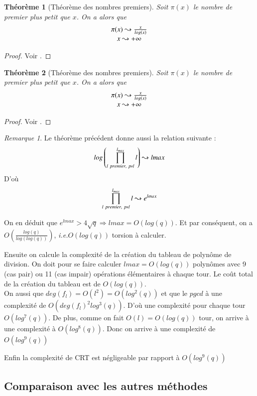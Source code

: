 \documentclass{article}%
\theoremstyle{plain}
\newtheorem{theoreme}{Théorème}[section]
\theoremstyle{definition}
\theoremstyle{plain}
\theoremstyle{plain}
\theoremstyle{remark}
\newtheorem*{remarque}{Remarque}
\newcommand\ie{\textit{i.e.}}
\begin{document}
\begin{theoreme}[Théorème des nombres premiers]
Soit $\pi(x)$ le nombre de premier plus petit que $x$. On a alors que $$
\begin{array}{cl cl}
\pi(x)\leadsto\frac{x}{log(x)}\\
x \leadsto +\infty 
\end{array}$$
\end{theoreme}
\begin{proof}
Voir \cite{ref5}.
\end{proof}
\begin{theoreme}[Théorème des nombres premiers]
Soit $\pi(x)$ le nombre de premier plus petit que $x$. On a alors que $$
\begin{array}{cl cl}
\pi(x)\leadsto\frac{x}{log(x)}\\
x \leadsto +\infty 
\end{array}$$
\end{theoreme}
\begin{proof}
Voir \cite{ref5}.
\end{proof}
\begin{remarque}
Le théorème précédent donne aussi la relation suivante :
$$log\left(\prod_{l\ premier,\ p\nshortmid l}^{l_{max}}l\right) \leadsto lmax$$
D'où $$\prod_{l\ premier,\ p\nshortmid l}^{l_{max}}l\leadsto e^{lmax}$$  
\end{remarque}
On en déduit que $e^{lmax}>4\sqrt{q} \Rightarrow lmax = O(log(q))$. Et par conséquent, on a $O\left(\frac{log(q)}{log(log(q))}\right)$, \ie $O(log(q))$ torsion à calculer.


Ensuite on calcule la complexité de la création du tableau de polynôme de division.
On doit pour se faire calculer $lmax = O(log(q))$ polynômes avec 9 (cas pair) ou 11 (cas impair) opérations élémentaires à chaque tour. Le coût total de la création du tableau est de $O(log(q))$.\\


On aussi que $deg(f_{l})=O(l^{2})=O(log^{2}(q))$ et que le $pgcd$ à une complexité de $O(deg(f_{l})^{2}log^{3}(q))$.
D'où une complexité pour chaque tour $O(log^{7}(q))$.
De plus, comme on fait $O(l)=O(log(q))$ tour, on arrive à une complexité à $O(log^{8}(q))$.
Donc on arrive à une complexité de $O(log^{9}(q))$

Enfin la complexité de CRT est négligeable par rapport à $O(log^{9}(q))$

\subsection{Comparaison avec les autres méthodes}
\end{document}
